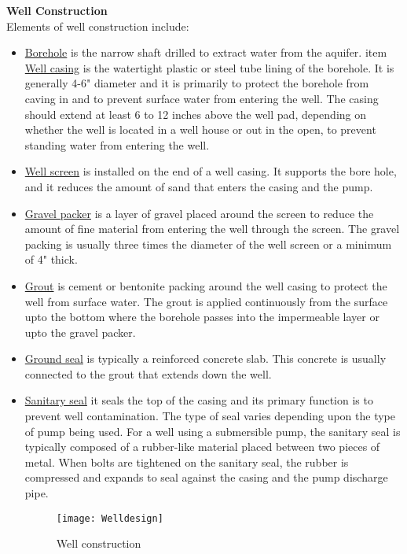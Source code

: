 \textbf{Well Construction} \\
Elements of well construction include:\\
\begin{itemize}
\item \ul{Borehole}  is the narrow shaft drilled to extract water from the aquifer.
item \ul{Well casing}  is the watertight plastic  or steel tube lining of the borehole.  It is generally 4-6" diameter and it is primarily to protect the borehole from caving in and to prevent surface water from entering the well.  The casing should extend at least 6 to 12 inches above the
well pad, depending on whether the well is located in a well house or out in the open, to prevent standing water from entering the well.
\item \ul{Well screen}   is installed on the end of a well casing.  It supports the bore hole, and it reduces the amount of sand that enters the casing and the pump.
\item \ul{Gravel packer}  is a layer of gravel placed around the screen to reduce the amount of fine material from entering the well through the screen.  The gravel packing is usually three times the diameter of the well screen or a minimum of 4" thick.
\item \ul{Grout}  is cement or bentonite packing around the well casing to protect the well from surface water.  The grout is applied continuously from the surface upto the bottom where the borehole passes into the impermeable layer or upto the gravel packer.
\item \ul{Ground seal} is typically a reinforced concrete slab. This concrete is usually connected to the grout that extends down the well.
\item \ul{Sanitary seal} it seals the top of the casing and its primary function is to prevent well contamination.  The type of seal varies depending upon the type of pump being used.  For a well using a submersible pump, the sanitary seal is typically composed of a rubber-like material
placed between two pieces of metal. When bolts are tightened on the sanitary seal, the rubber is compressed and expands to seal against the casing and the pump discharge pipe.
\begin{figure}[h!]
\begin{center}
\texttt{[image: Welldesign]}
\caption{Well construction}
\label{Well construction}
\end{center}
\end{figure}
\end{itemize}
